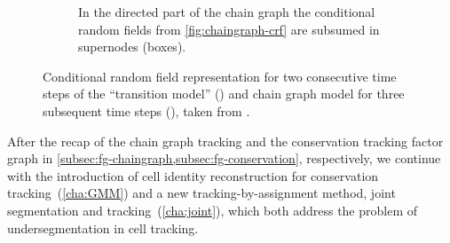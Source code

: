 \begin{figure}[h]
\begin{subfigure}[t]{0.48\textwidth}
        \caption{In the directed part of the chain graph the conditional random fields from
            \cref{fig:chaingraph-crf} are subsumed in supernodes (boxes).}
        \label{fig:chaingraph-bn}
    \end{subfigure}
    \caption[Chain graph model]{Conditional random field representation for two consecutive time steps
        of the ``transition model'' () and chain graph model for three
        subsequent time steps (), taken from \citet{kausler_12_discrete}.}
    \label{fig:chaingraph-model}
\end{figure}

After the recap of the chain graph tracking and the conservation tracking factor graph in
\cref{subsec:fg-chaingraph,subsec:fg-conservation}, respectively, we continue with the introduction
of cell identity reconstruction for conservation tracking~(\cref{cha:GMM}) and a new
tracking-by-assignment method, joint segmentation and tracking~(\cref{cha:joint}), which both
address the problem of undersegmentation in cell tracking.


